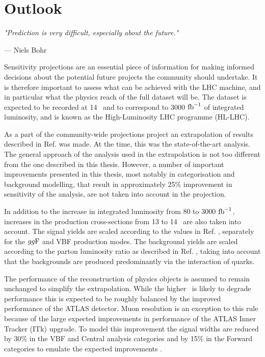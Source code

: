 \chapter{Outlook}

\textit{"Prediction is very difficult, especially about the future."}

\vspace{5mm}
\begin{flushright}
--- Niels Bohr
\end{flushright}

\thispagestyle{empty}

\newpage

Sensitivity projections are an essential piece of information for
making informed decisions about the potential future projects the community
should undertake.
It is therefore important to assess what can be achieved with the LHC
machine, and in particular what the physics reach of the full dataset
will be. The dataset is expected to be recorded at 14 \TeV~and to
correspond to 3000 $\text{fb}^{-1}$ of integrated luminosity, and is known
as the High-Luminosity LHC programme (HL-LHC).

As a part of the community-wide projections project \cite{ATL-PHYS-PUB-2018-054, Cepeda:2019klc}
an extrapolation of results described in Ref. \cite{ATLAS-CONF-2018-026}
was made. At the time, this was the state-of-the-art analysis.
The general approach of the analysis used in the extrapolation
is not too different from the one described in this thesis. However, a number
of important improvements presented in this thesis, most notably in categorisation
and background modelling, that result in approximately 25\% improvement
in sensitivity of the analysis, are not taken into account in the projection.

In addition to the increase in integrated luminosity from 80 to 3000 $\text{fb}^{-1}$,
increases in the production cross-sections from 13 to 14 \TeV~are also
taken into account. The signal yields are scaled according to the
values in Ref. \cite{deFlorian:2016spz}, separately for the $gg\text{F}$
and VBF production modes. The background yields are scaled according
to the parton luminosity ratio as described in Ref. \cite{Heinemeyer:2013tqa},
taking into account that the backgrounds are produced predominantly via
the interaction of quarks.

The performance of the reconstruction of physics objects is assumed
to remain unchanged to simplify the extrapolation. While the higher
\pileup~is likely to degrade performance this is expected to be
roughly balanced by the improved performance of the ATLAS detector.
Muon resolution is an exception to this rule because of the
large expected improvements in performance of the ATLAS Inner Tracker (ITk)
upgrade. To model this improvement the signal widths are reduced 
by 30\% in the VBF and Central analysis categories and by 15\% in
the Forward categories to emulate the expected improvements
\cite{Collaboration:2285585}.

